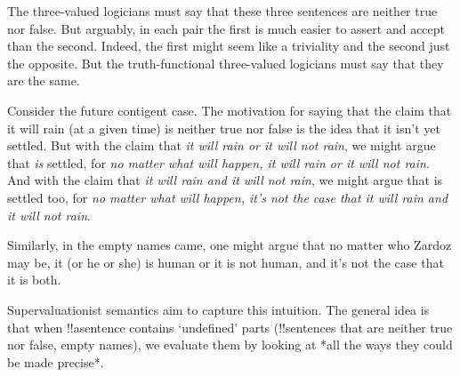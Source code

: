 \documentclass[../../../include/open-logic-section]{subfiles}
\begin{document}
The three-valued logicians must say that these three sentences are neither true nor false. But arguably, in each pair the first is much easier to assert and accept than the second. Indeed, the first might seem like a triviality and the second just the opposite. But the truth-functional three-valued logicians must say that they are the same. 

Consider the future contigent case. The motivation for saying that the claim that it will rain (at a given time) is neither true nor false is the idea that it isn't yet settled. But with the claim that \emph{it will rain or it will not rain}, we might argue that \emph{is} settled, for \emph{no matter what will happen, it will rain or it will not rain}. And with the claim that \emph{it will rain and it will not rain}, we might argue that is settled too, for \emph{no matter what will happen, it's not the case that it will rain and it will not rain}. 

Similarly, in the empty names came, one might argue that no matter who Zardoz may be, it (or he or she) is human or it is not human, and it's not the case that it is both. 

Supervaluationist semantics aim to capture this intuition. The general idea is that when !!a{sentence} contains `undefined' parts (!!{sentence}s that are neither true nor false, empty names), we evaluate them by looking at *all the ways they could be made precise*. 
\end{document}
